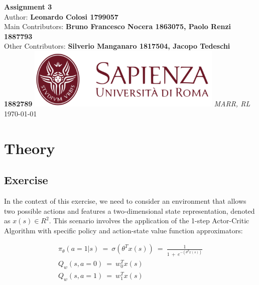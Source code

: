 \documentclass[10pt,a4paper]{article}
\begin{document}
\begin{titlepage}
    \begin{center}
        \vspace*{1cm}
        \Huge\textbf{Assignment 3}\\
        \vspace{1.5cm}
        \Large Author:
        \textbf{Leonardo Colosi 1799057}\\
        \vspace{0.5cm}
        \Large Main Contributors: \textbf{Bruno Francesco Nocera 1863075, Paolo Renzi 1887793} \\
        \vspace{0.3cm} 
        \Large Other Contributors: \textbf{Silverio Manganaro 1817504, Jacopo Tedeschi 1882789}
        \vfill
        \includegraphics[width=0.7\textwidth]{images/sapienza_logo.png}
        \vfill
        \vspace{0.8cm}
        \Large \textit{MARR, RL}\\
        \today
    \end{center}
\end{titlepage}
\newpage

\tableofcontents
\newpage

\section{Theory}
\subsection{Exercise}
In the context of this exercise, we need to consider an environment that allows two possible actions and features a two-dimensional state representation, denoted as $x(s)\in R^2$. This scenario involves the application of the 1-step Actor-Critic Algorithm with specific policy and action-state value function approximators:

\begin{gather*}
    \pi_{\theta}(a=1|s) \:=\: \sigma(\theta^{T} x(s)) \:=\: \frac{1}{1\:+\:e^{-(\theta^{T} x(s))}} \\
    Q_w (s,a=0) \:=\: w_{0}^{T}x(s) \\
    Q_w (s,a=1) \:=\: w_{1}^{T}x(s)
\end{gather*} 
\end{document}
